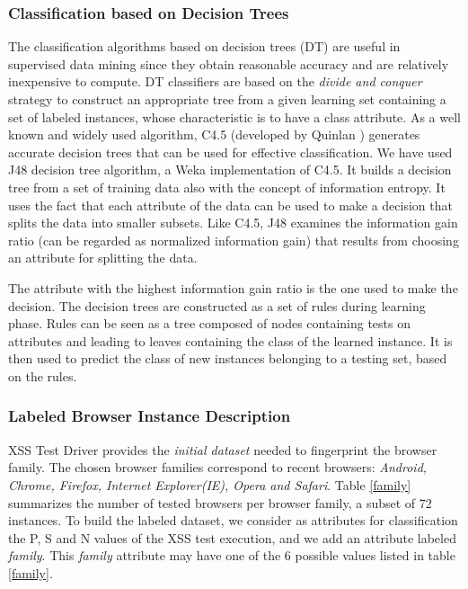 \documentclass[10pt]{IEEEtran}
\begin{document}
\subsubsection{Classification based on Decision Trees}
The classification algorithms based on decision trees (DT) are useful in supervised data mining since they obtain reasonable accuracy
and are relatively inexpensive to compute. DT classifiers are based on the
\emph{divide and conquer} strategy to construct an appropriate tree from a given learning
set containing a set of labeled instances, whose characteristic is to have a class
attribute. As a well known and widely used algorithm, C4.5 (developed by Quinlan \cite{quinlan1993c4})
generates accurate decision trees that can be used for effective classification. We have
used J48 decision tree algorithm, a Weka \cite{hall2009weka} implementation of C4.5. 
It builds a decision tree from a set of training data also with the concept of information
entropy. It uses the fact that each attribute of the data can be used to make a decision
that splits the data into smaller subsets. Like C4.5, J48 examines the information gain
ratio (can be regarded as normalized information gain) that results from choosing an
attribute for splitting the data. 


The attribute with the highest information gain ratio
is the one used to make the decision. The decision trees are constructed as a set of rules
during learning phase. Rules can be seen as a tree composed of nodes containing tests on
attributes and leading to leaves containing the class of the learned instance. It is then
used to predict the class of new instances belonging to a testing set, based on the rules. 


\subsubsection{Labeled Browser Instance Description}
XSS Test Driver provides the \emph{initial dataset} needed to fingerprint the browser family. 
The chosen browser families correspond to recent browsers: \emph{Android, Chrome, Firefox, 
Internet Explorer(IE), Opera and Safari}.
Table \ref{family} summarizes the number of tested browsers per browser family, a subset of 72 
instances. 
To build the labeled dataset, we consider as attributes for classification the P, S and N values of the XSS test execution, and we add an attribute labeled \emph{family}.
 This  \emph{family} attribute may have one of the 6 possible values listed in table \ref{family}.
\end{document}
